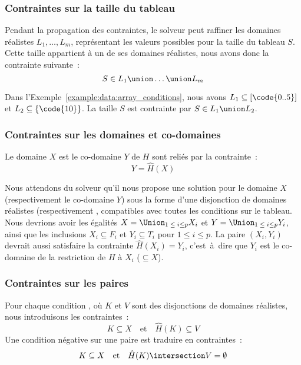 \subsubsection{Contraintes sur la taille du tableau}

Pendant la propagation des contraintes, le solveur peut raffiner les domaines
réalistes $L_1, \dots, L_m$, représentant les valeurs possibles pour la taille du
tableau $S$. Cette taille appartient à un de ses domaines réalistes, nous avons
donc la contrainte suivante~:
%
$$S \in L_1 \union \dots \union L_m$$

Dans l'Exemple~\ref{example:data:array_conditions}, nous avons $L_1 \subseteq
[\code{0..5}]$ et $L_2 \subseteq \{\code{10}\}$. La taille $S$ est contrainte
par $S \in L_1 \union L_2$.

\subsubsection{Contraintes sur les domaines et co-domaines}

Le domaine $X$ est le co-domaine $Y$ de $H$ sont reliés par la contrainte~:
%
$$Y = \hat{H}(X)$$

Nous attendons du solveur qu'il nous propose une solution pour le domaine $X$
(respectivement le co-domaine $Y$) sous la forme d'une disjonction de domaines
réalistes  (respectivement , compatibles avec toutes les conditions sur le tableau. Nous
devrions avoir les égalités $X = \Union_{1 \;\leq\; i \leq p} X_i$ et $Y =
\Union_{1 \;\leq\; i \leq p} Y_i$, ainsi que les inclusions $X_i \subseteq F_i$
et $Y_i \subseteq T_i$ pour $1 \leq i \leq p$. La paire $(X_i, Y_i)$ devrait
aussi satisfaire la contrainte $\hat{H}(X_i) = Y_i$, c'est~à~dire que $Y_i$ est
le co-domaine de la restriction de $H$ à $X_i$ ($\subseteq X$).

\subsubsection{Contraintes sur les paires}

Pour chaque condition , où $K$ et $V$ sont des disjonctions de
domaines réalistes, nous introduisons les contraintes~:
%
$$K \subseteq X \quad\mathrm{et}\quad \hat{H}(K) \subseteq V$$
%
Une condition négative sur une paire  est traduire en
contraintes~:
%
$$K \subseteq X \quad\mathrm{et}\quad \hat{H}(K) \intersection V = \emptyset$$

